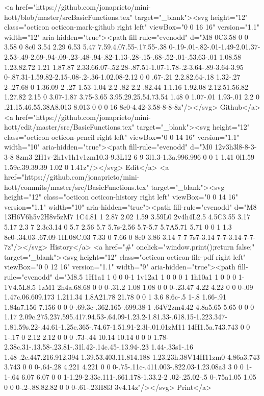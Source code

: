 {{      <a href="https://github.com/jonaprieto/mini-hott/blob/master/srcBasicFunctions.tex" target="_blank"><svg height="12" class="octicon octicon-mark-github right left" viewBox="0 0 16 16" version="1.1" width="12" aria-hidden="true"><path fill-rule="evenodd" d="M8 0C3.58 0 0 3.58 0 8c0 3.54 2.29 6.53 5.47 7.59.4.07.55-.17.55-.38 0-.19-.01-.82-.01-1.49-2.01.37-2.53-.49-2.69-.94-.09-.23-.48-.94-.82-1.13-.28-.15-.68-.52-.01-.53.63-.01 1.08.58 1.23.82.72 1.21 1.87.87 2.33.66.07-.52.28-.87.51-1.07-1.78-.2-3.64-.89-3.64-3.95 0-.87.31-1.59.82-2.15-.08-.2-.36-1.02.08-2.12 0 0 .67-.21 2.2.82.64-.18 1.32-.27 2-.27.68 0 1.36.09 2 .27 1.53-1.04 2.2-.82 2.2-.82.44 1.1.16 1.92.08 2.12.51.56.82 1.27.82 2.15 0 3.07-1.87 3.75-3.65 3.95.29.25.54.73.54 1.48 0 1.07-.01 1.93-.01 2.2 0 .21.15.46.55.38A8.013 8.013 0 0 0 16 8c0-4.42-3.58-8-8-8z"/></svg> Github</a>
      <a href="https://github.com/jonaprieto/mini-hott/edit/master/src/BasicFunctions.tex" target="_blank"><svg height="12" class="octicon octicon-pencil right left" viewBox="0 0 14 16" version="1.1" width="10" aria-hidden="true"><path fill-rule="evenodd" d="M0 12v3h3l8-8-3-3-8 8zm3 2H1v-2h1v1h1v1zm10.3-9.3L12 6 9 3l1.3-1.3a.996.996 0 0 1 1.41 0l1.59 1.59c.39.39.39 1.02 0 1.41z"/></svg> Edit</a>
      <a href="https://github.com/jonaprieto/mini-hott/commits/master/src/BasicFunctions.tex" target="_blank"><svg height="12" class="octicon octicon-history right left" viewBox="0 0 14 16" version="1.1" width="10" aria-hidden="true"><path fill-rule="evenodd" d="M8 13H6V6h5v2H8v5zM7 1C4.81 1 2.87 2.02 1.59 3.59L0 2v4h4L2.5 4.5C3.55 3.17 5.17 2.3 7 2.3c3.14 0 5.7 2.56 5.7 5.7s-2.56 5.7-5.7 5.7A5.71 5.71 0 0 1 1.3 8c0-.34.03-.67.09-1H.08C.03 7.33 0 7.66 0 8c0 3.86 3.14 7 7 7s7-3.14 7-7-3.14-7-7-7z"/></svg> History</a>
      <a  href="#" onclick="window.print();return false;" target="_blank"><svg height="12" class="octicon octicon-file-pdf right left" viewBox="0 0 12 16" version="1.1" width="9" aria-hidden="true"><path fill-rule="evenodd" d="M8.5 1H1a1 1 0 0 0-1 1v12a1 1 0 0 0 1 1h10a1 1 0 0 0 1-1V4.5L8.5 1zM1 2h4a.68.68 0 0 0-.31.2 1.08 1.08 0 0 0-.23.47 4.22 4.22 0 0 0-.09 1.47c.06.609.173 1.211.34 1.8A21.78 21.78 0 0 1 3.6 8.6c-.5 1-.8 1.66-.91 1.84a7.156 7.156 0 0 0-.69.3c-.362.165-.699.38-1 .64V2zm4.42 4.8a5.65 5.65 0 0 0 1.17 2.09c.275.237.595.417.94.53-.64.09-1.23.2-1.81.33-.618.15-1.223.347-1.81.59s.22-.44.61-1.25c.365-.74.67-1.51.91-2.3l-.01.01zM11 14H1.5a.743.743 0 0 1-.17 0 2.12 2.12 0 0 0 .73-.44 10.14 10.14 0 0 0 1.78-2.38c.31-.13.58-.23.81-.31l.42-.14c.45-.13.94-.23 1.44-.33s1-.16 1.48-.2c.447.216.912.394 1.39.53.403.11.814.188 1.23.23h.38V14H11zm0-4.86a3.743 3.743 0 0 0-.64-.28 4.221 4.221 0 0 0-.75-.11c-.411.003-.822.03-1.23.08a3 3 0 0 1-1-.64 6.07 6.07 0 0 1-1.29-2.33c.111-.661.178-1.33.2-2 .02-.25.02-.5 0-.75a1.05 1.05 0 0 0-.2-.88.82.82 0 0 0-.61-.23H8l3 3v4.14z"/></svg> Print</a>
}}
